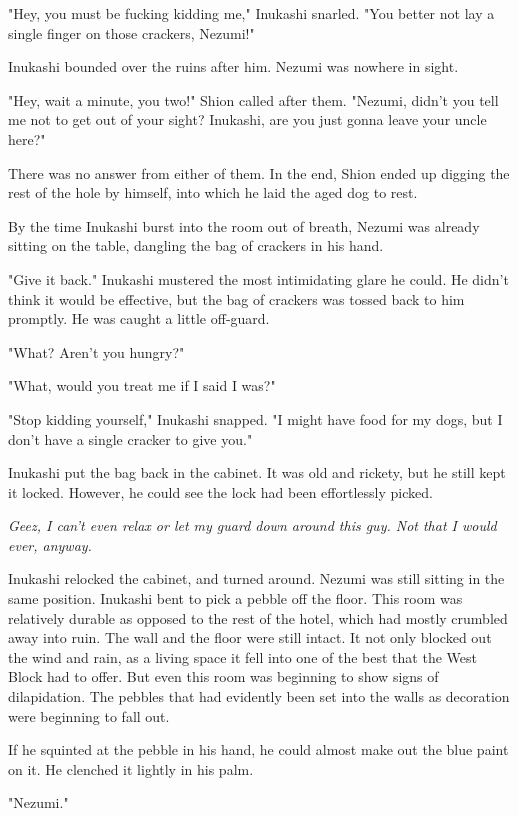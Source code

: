 "Hey, you must be fucking kidding me," Inukashi snarled. "You better not
lay a single finger on those crackers, Nezumi!"

Inukashi bounded over the ruins after him. Nezumi was nowhere in sight.

"Hey, wait a minute, you two!" Shion called after them. "Nezumi, didn't
you tell me not to get out of your sight? Inukashi, are you just gonna
leave your uncle here?"

There was no answer from either of them. In the end, Shion ended up
digging the rest of the hole by himself, into which he laid the aged dog
to rest.

\myspace

By the time Inukashi burst into the room out of breath, Nezumi was
already sitting on the table, dangling the bag of crackers in his hand.

"Give it back." Inukashi mustered the most intimidating glare he could.
He didn't think it would be effective, but the bag of crackers was
tossed back to him promptly. He was caught a little off-guard.

"What? Aren't you hungry?"

"What, would you treat me if I said I was?"

"Stop kidding yourself," Inukashi snapped. "I might have food for my
dogs, but I don't have a single cracker to give you."

Inukashi put the bag back in the cabinet. It was old and rickety, but he
still kept it locked. However, he could see the lock had been
effortlessly picked.

\emph{Geez, I can't even relax or let my guard down around this guy. Not that
I would ever, anyway.}

Inukashi relocked the cabinet, and turned around. Nezumi was still
sitting in the same position. Inukashi bent to pick a pebble off the
floor. This room was relatively durable as opposed to the rest of the
hotel, which had mostly crumbled away into ruin. The wall and the floor
were still intact. It not only blocked out the wind and rain, as a
living space it fell into one of the best that the West Block had to
offer. But even this room was beginning to show signs of dilapidation.
The pebbles that had evidently been set into the walls as decoration
were beginning to fall out.

If he squinted at the pebble in his hand, he could almost make out the
blue paint on it. He clenched it lightly in his palm.

"Nezumi."

